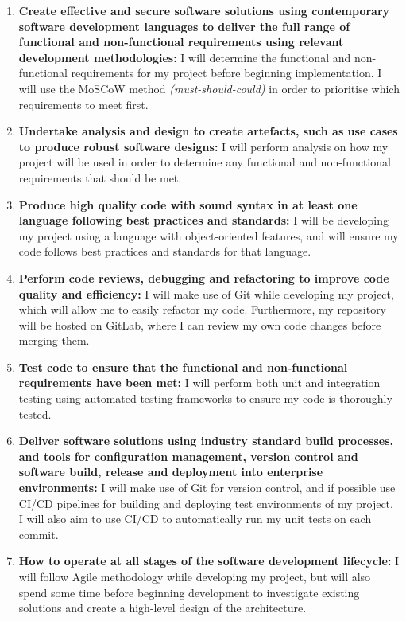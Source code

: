 \documentclass[12pt]{article}
\begin{document}
	\begin{enumerate}
		\item \textbf{Create effective and secure software solutions using contemporary software development languages to deliver the full range of functional and non-functional requirements using relevant development methodologies:} 
		I will determine the functional and non-functional requirements for my project before beginning implementation. I will use the MoSCoW method \textit{(must-should-could)} in order to prioritise which requirements to meet first. 
		\item \textbf{Undertake analysis and design to create artefacts, such as use cases to produce robust software designs:} 
		I will perform analysis on how my project will be used in order to determine any functional and non-functional requirements that should be met.
		\item \textbf{Produce high quality code with sound syntax in at least one language following best practices and standards:} 
		I will be developing my project using a language with object-oriented features, and will ensure my code follows best practices and standards for that language.
		\item \textbf{Perform code reviews, debugging and refactoring to improve code quality and efficiency:} I will make use of Git while developing my project, which will allow me to easily refactor my code. Furthermore, my repository will be hosted on GitLab, where I can review my own code changes before merging them.
		\item \textbf{Test code to ensure that the functional and non-functional requirements have been met:}
		I will perform both unit and integration testing using automated testing frameworks to ensure my code is thoroughly tested.
		\item \textbf{Deliver software solutions using industry standard build processes, and tools for configuration management, version control and software build, release and deployment into enterprise environments:}
		I will make use of Git for version control, and if possible use CI/CD pipelines for building and deploying test environments of my project. I will also aim to use CI/CD to automatically run my unit tests on each commit.
		\item \textbf{How to operate at all stages of the software development lifecycle:}
		I will follow Agile methodology while developing my project, but will also spend some time before beginning development to investigate existing solutions and create a high-level design of the architecture.

\end{enumerate}
\end{document}
